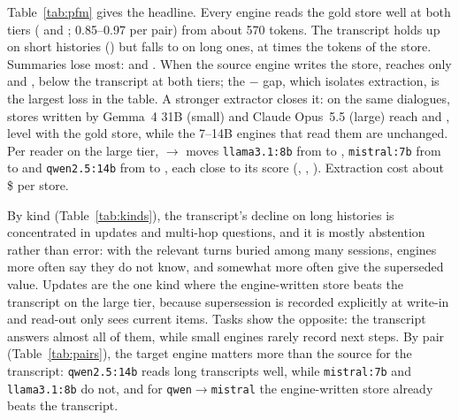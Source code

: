 Table~\ref{tab:pfm} gives the headline. Every engine reads the gold store well at both tiers
( and ; 0.85--0.97 per pair) from about 570 tokens. The
transcript holds up on short histories () but falls to  on long
ones, at  times the tokens of the store. Summaries lose most:
 and . When the source engine writes the store,  reaches
only  and , below the transcript at both tiers; the
$-$ gap, which isolates extraction, is the largest loss in the table.
A stronger extractor closes it: on the same dialogues, stores written by Gemma~4 31B (small) and
Claude Opus~5.5 (large) reach  and 
, level with the gold store, while the 7--14B engines that read them
are unchanged. Per reader on the large tier, $\to$ moves
\texttt{llama3.1:8b} from  to ,
\texttt{mistral:7b} from  to  and
\texttt{qwen2.5:14b} from  to , each
close to its  score (,
, ). Extraction cost
about \$ per store.

By kind (Table~\ref{tab:kinds}), the transcript's decline on long histories is concentrated in
updates and multi-hop questions, and it is mostly abstention rather than error: with the relevant
turns buried among many sessions, engines more often say they do not know, and somewhat more often
give the superseded value. Updates are the one kind where the engine-written store beats
the transcript on the large tier, because supersession is recorded explicitly at write-in and
read-out only sees current items. Tasks show the opposite: the transcript answers almost all of
them, while small engines rarely record next steps. By pair (Table~\ref{tab:pairs}), the target
engine matters more than the source for the transcript: \texttt{qwen2.5:14b} reads long
transcripts well, while \texttt{mistral:7b} and \texttt{llama3.1:8b} do not, and for
\texttt{qwen}$\to$\texttt{mistral} the engine-written store already beats the transcript.

